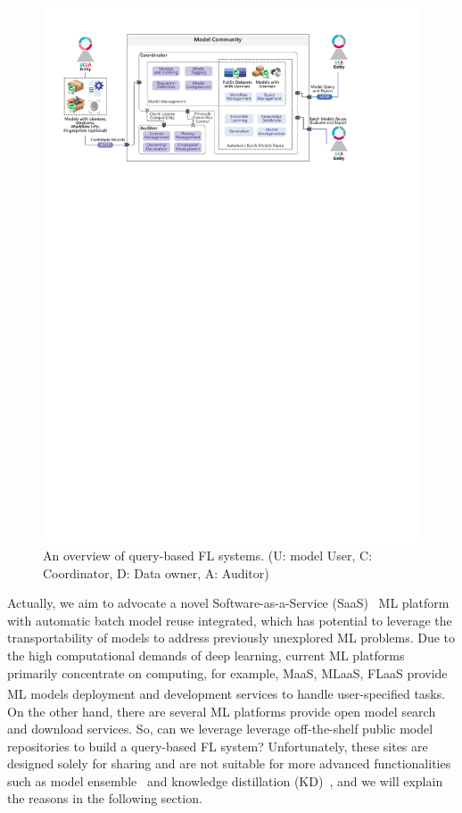 \begin{figure}[t]
  \centering
  \includegraphics[width=\linewidth]{fig/query_frame.pdf}
  \caption{An overview of query-based FL systems. (U: model User, C: Coordinator, D: Data owner, A: Auditor)}
  \vspace{-5mm}
  \label{fig:query}
\end{figure}

Actually, we aim to advocate a novel Software-as-a-Service (SaaS)~\cite{brereton1999future} ML platform with automatic batch model reuse integrated, which has potential to leverage the transportability of models to address previously unexplored ML problems.
Due to the high computational demands of deep learning, current ML platforms primarily concentrate on computing, for example, MaaS, MLaaS, FLaaS provide ML models deployment and development services to handle user-specified tasks\textsuperscript{}.
On the other hand, there are several ML platforms provide open model search and download services. 
So, can we leverage leverage off-the-shelf public model repositories to build a query-based FL system?
Unfortunately, these sites are designed solely for sharing and are not suitable for more advanced functionalities such as model ensemble~\cite{jacobs1991adaptive} and knowledge distillation (KD)~\cite{hinton2015distilling}, and we will explain the reasons in the following section.

